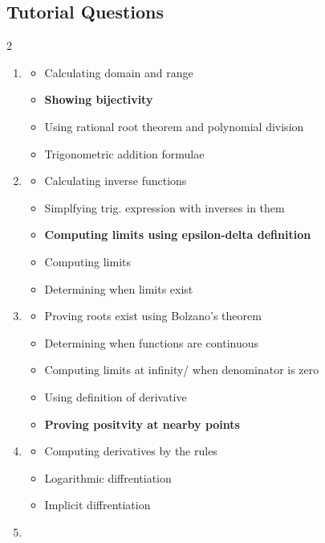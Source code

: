 \documentclass{article}
\begin{document}
\subsection*{Tutorial Questions}
\begin{multicols}{2}
\begin{enumerate}
    \item \begin{itemize}
            \item Calculating domain and range
            \item \textbf{Showing bijectivity}
            \item Using rational root theorem and polynomial division
            \item Trigonometric addition formulae
        \end{itemize}
    \item \begin{itemize}
            \item Calculating inverse functions
            \item Simplfying trig. expression with inverses in them
            \item \textbf{Computing limits using epsilon-delta definition}
            \item Computing limits
            \item Determining when limits exist
        \end{itemize}
    \item \begin{itemize}
            \item Proving roots exist using Bolzano's theorem
            \item Determining when functions are continuous
            \item Computing limits at infinity/ when denominator is zero
            \item Using definition of derivative
            \item \textbf{Proving positvity at nearby points}
        \end{itemize}
    \item \begin{itemize}
            \item Computing derivatives by the rules
            \item Logarithmic diffrentiation
            \item Implicit diffrentiation
        \end{itemize}
    \item \begin{itemize}

\end{itemize}
\end{enumerate}
\end{multicols}
\end{document}
